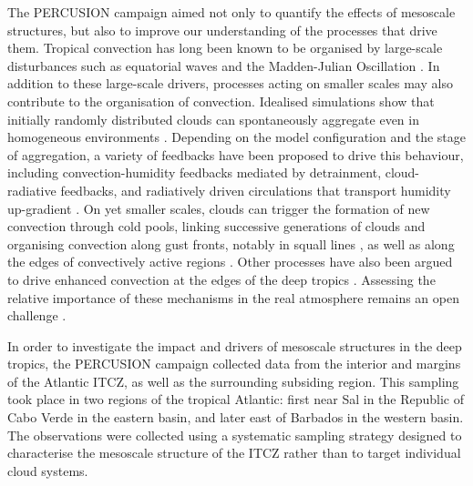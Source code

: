 \documentclass{article}
\begin{document}
The PERCUSION campaign aimed not only to quantify the effects of mesoscale structures, but also to improve our understanding of the processes that drive them. Tropical convection has long been known to be organised by large-scale disturbances such as equatorial waves \citep[e.g.,][]{kiladisConvectivelyCoupledEquatorial2009} and the Madden-Julian Oscillation \citep{maddenDetection4050Day1971, maddenDescriptionGlobalScaleCirculation1972}. 
In addition to these large-scale drivers, processes acting on smaller scales may also contribute to the organisation of convection.
Idealised simulations show that initially randomly distributed clouds can spontaneously aggregate even in homogeneous environments \citep{Held1993, Bretherton2005}. Depending on the model configuration and the stage of aggregation, a variety of feedbacks have been proposed to drive this behaviour, including convection-humidity feedbacks mediated by detrainment, cloud-radiative feedbacks, and radiatively driven circulations that transport humidity up-gradient \citep[e.g.,][]{Wing2017}.
On yet smaller scales, clouds can trigger the formation of new convection through cold pools, linking successive generations of clouds and organising convection along gust fronts, notably in squall lines \citep{Rotunno1988, Weisman2004}, as well as along the edges of convectively active regions \citep{Nolan2016, windmillerConvectionEdge2019}.
Other processes have also been argued to drive enhanced convection at the edges of the deep tropics \citep{masunagaEdgeIntensificationEastern2023}. Assessing the relative importance of these mechanisms in the real atmosphere remains an open challenge \citep{Bony2015, mullerSpontaneousAggregationConvective2022}.

In order to investigate the impact and drivers of mesoscale structures in the deep tropics, the PERCUSION campaign collected data from the interior and margins of the Atlantic ITCZ, as well as the surrounding subsiding region. This sampling took place in two regions of the tropical Atlantic: first near Sal in the Republic of Cabo Verde in the eastern basin, and later east of Barbados in the western basin. The observations were collected using a systematic sampling strategy designed to characterise the mesoscale structure of the ITCZ rather than to target individual cloud systems. 
\end{document}
